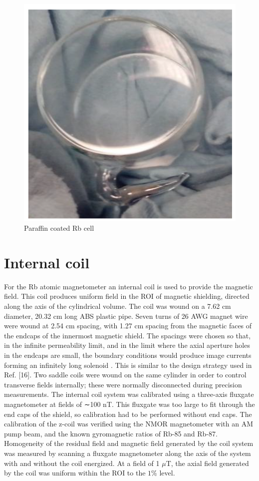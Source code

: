 \begin{figure}[h]
\centering
\includegraphics[width=0.5\linewidth]{figures/cell}
\caption{Paraffin coated Rb cell}
\end{figure}
\newpage
\section{Internal coil}
 For the Rb atomic magnetometer an internal coil is used to provide the magnetic field. This coil produces uniform field in the ROI of magnetic shielding, directed along the axis of the cylindrical volume. The coil was wound on a 7.62 cm diameter, 20.32 cm long ABS plastic pipe. Seven turns of 26 AWG magnet wire were wound at 2.54 cm spacing, with 1.27 cm spacing from the magnetic faces of the endcaps of the innermost magnetic shield. The spacings were chosen so that, in the infinite permeability limit, and in the limit where the axial aperture holes in the endcaps are small, the boundary conditions would produce image currents forming an infinitely long solenoid . This is similar to the design strategy used in Ref. [16]. Two saddle coils were wound on the same cylinder in order to control transverse fields internally; these were normally disconnected during precision measurements. The internal coil system was calibrated using a three-axis fluxgate magnetometer at fields of ∼100 nT. This fluxgate was too large to fit through the end caps of the shield, so calibration
had to be performed without end caps. The calibration of the z-coil was verified using the NMOR magnetometer with an AM pump beam, and the known gyromagnetic ratios of Rb-85 and Rb-87. Homogeneity of the residual field and magnetic field generated by the coil system was measured by scanning a fluxgate magnetometer along the axis of the system with and without the coil energized. At a field of 1 $\mu$T, the axial field generated by the coil was uniform within the ROI to the $1\%$  level.

